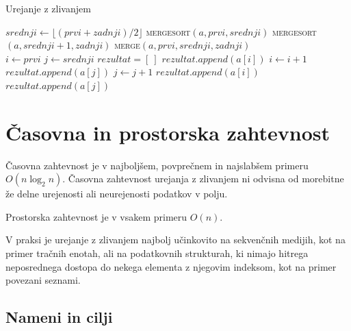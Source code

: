 \documentclass[a4paper,oneside,10pt]{article}
\begin{document}
\begin{algorithm}
  \caption{Urejanje z zlivanjem}\label{algo:mergesort}
  \begin{algorithmic}[1]
         \Return \EndIf
        \State $srednji \gets \lfloor(prvi + zadnji) / 2\rfloor$
        \State \textsc{mergesort}$(a, prvi, srednji)$
        \State \textsc{mergesort}$(a, srednji + 1, zadnji)$
        \State \textsc{merge}$(a, prvi, srednji, zadnji)$
    \EndFunction
    \\
        \State $i \gets prvi$
        \State $j \gets srednji$
        \State $rezultat = [\ ]$ 
                \State $rezultat.append(a[i])$ 
                \State $i \gets i + 1$
            \Else
                \State $rezultat.append(a[j])$ 
                \State $j \gets j + 1$
            \EndIf
        \EndWhile
            \State $rezultat.append(a[i])$ 
        \EndWhile
            \State $rezultat.append(a[j])$ 
        \EndWhile
    \EndFunction
  \end{algorithmic}
\end{algorithm}

\section{Časovna in prostorska zahtevnost}
Časovna zahtevnost je v najboljšem, povprečnem in najslabšem primeru 
$O(n\log_2 n)$. Časovna zahtevnost urejanja z zlivanjem ni odvisna od
morebitne že delne urejenosti ali neurejenosti podatkov v polju. 

Prostorska zahtevnost je v vsakem primeru $O(n)$. %

V praksi je urejanje z zlivanjem najbolj učinkovito na
sekvenčnih medijih, kot na primer tračnih enotah, ali na podatkovnih strukturah, ki nimajo hitrega
neposrednega dostopa do nekega elementa z njegovim indeksom, kot na primer povezani seznami.

\subsection{Nameni in cilji}
\end{document}
